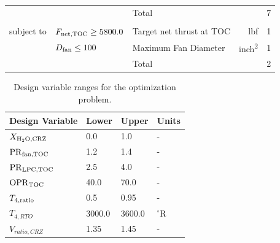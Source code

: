 \documentclass[conf]{new-aiaa}
\begin{document}
\begin{table}[hbt!]
\begin{tabular}{r l l r l}
    \cline{3-5}
                    &                                & Total                                                                    &                & 7        \\
                    &                                &                                                                          &                &          \\
    subject to      & $F_{\rm{net,TOC}} \geq 5800.0$ & Target net thrust at TOC                                                 & \si{lbf}       & 1        \\
                    & $D_{\rm{fan}} \leq 100$        & Maximum Fan Diameter                                                     & \si{inch^2}    & 1        \\
    \cline{3-5}
                    &                                & Total                                                                    &                & 2        \\
    \bottomrule
  \end{tabular}
  \label{tab:opt_problem}
\end{table}

\begin{table}[hbt!]
  \centering
  \caption{Design variable ranges for the optimization problem.
  }
  \small
  \renewcommand{\arraystretch}{1.2}
  \begin{tabular}{l l l l}
    Design Variable          & Lower  & Upper  & Units     \\
    \toprule
    $X_{\rm{H_2O,CRZ}}$      & 0.0    & 1.0    & -         \\
    $\rm{PR}_{\rm{fan,TOC}}$ & 1.2    & 1.4    & -         \\
    $\rm{PR}_{\rm{LPC,TOC}}$ & 2.5    & 4.0    & -         \\
    $\rm{OPR}_{\rm{TOC}}$    & 40.0   & 70.0   & -         \\
    $T_{4,\rm{ratio}}$       & 0.5    & 0.95   & -         \\
    $T_{4,RTO}$              & 3000.0 & 3600.0 & $^\circ$R \\
    $V_{ratio,CRZ}$          & 1.35   & 1.45   & -         \\
    \bottomrule
  \end{tabular}
  \label{tab:dv_table}
\end{table}
\end{document}

